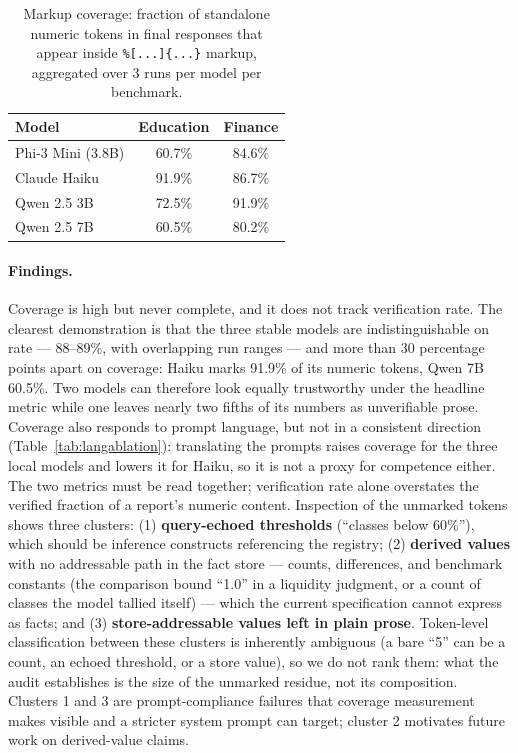 \documentclass[11pt,a4paper]{article}
\begin{document}
\begin{table}[h]
\centering
\small
\begin{tabular}{lcc}
\toprule
\textbf{Model} & \textbf{Education} & \textbf{Finance} \\
\midrule
Phi-3 Mini (3.8B) & 60.7\% & 84.6\% \\
Claude Haiku & 91.9\% & 86.7\% \\
Qwen 2.5 3B & 72.5\% & 91.9\% \\
Qwen 2.5 7B & 60.5\% & 80.2\% \\
\bottomrule
\end{tabular}
\caption{Markup coverage: fraction of standalone numeric tokens in final responses that appear inside \texttt{\%[...]\{...\}} markup, aggregated over 3 runs per model per benchmark.}
\label{tab:coverage}
\end{table}

\paragraph{Findings.} Coverage is high but never complete, and it does not track verification rate. The clearest demonstration is that the three stable models are indistinguishable on rate --- 88--89\%, with overlapping run ranges --- and more than 30 percentage points apart on coverage: Haiku marks 91.9\% of its numeric tokens, Qwen 7B 60.5\%. Two models can therefore look equally trustworthy under the headline metric while one leaves nearly two fifths of its numbers as unverifiable prose. Coverage also responds to prompt language, but not in a consistent direction (Table~\ref{tab:langablation}): translating the prompts raises coverage for the three local models and lowers it for Haiku, so it is not a proxy for competence either. The two metrics must be read together; verification rate alone overstates the verified fraction of a report's numeric content. Inspection of the unmarked tokens shows three clusters: (1) \textbf{query-echoed thresholds} (``classes below 60\%''), which should be inference constructs referencing the registry; (2) \textbf{derived values} with no addressable path in the fact store --- counts, differences, and benchmark constants (the comparison bound ``1.0'' in a liquidity judgment, or a count of classes the model tallied itself) --- which the current specification cannot express as facts; and (3) \textbf{store-addressable values left in plain prose}. Token-level classification between these clusters is inherently ambiguous (a bare ``5'' can be a count, an echoed threshold, or a store value), so we do not rank them: what the audit establishes is the size of the unmarked residue, not its composition. Clusters 1 and 3 are prompt-compliance failures that coverage measurement makes visible and a stricter system prompt can target; cluster 2 motivates future work on derived-value claims.
\end{document}
